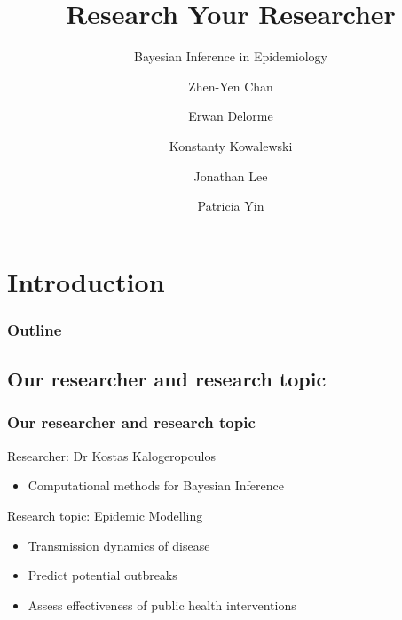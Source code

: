 \documentclass{beamer}
\title{Research Your Researcher}
\subtitle{Bayesian Inference in Epidemiology}
\date{}
\author{Zhen-Yen Chan \and Erwan Delorme \and
        Konstanty Kowalewski \and
        Jonathan Lee \and Patricia Yin}
\begin{document}
\begin{frame}
    \titlepage
\end{frame}

\section{Introduction}

\begin{frame}
    \frametitle{Outline}
    \tableofcontents
\end{frame}


\subsection{Our researcher and research topic}

\begin{frame}
\frametitle{Our researcher and research topic}
Researcher: Dr Kostas Kalogeropoulos
\begin{itemize}
    \item Computational methods for Bayesian Inference
\end{itemize}
\pause
\vspace{1em}
Research topic: Epidemic Modelling
\begin{itemize}
    \item Transmission dynamics of disease
    \item Predict potential outbreaks
    \item Assess effectiveness of public health interventions
\end{itemize}
\end{frame}
\end{document}

